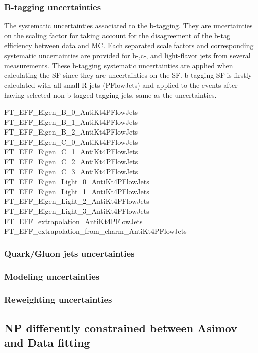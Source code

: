 \subsubsection{B-tagging uncertainties}
The systematic uncertainties associated to the b-tagging.
They are uncertainties on the scaling factor for taking account for the disagreement of the b-tag efficiency between data and MC. Each separated scale factors and corresponding systematic uncertainties are provided for b-,c-, and light-flavor jets from several measurements.
These b-tagging systematic uncertainties are applied when calculating the SF since they are uncertainties on the SF. b-tagging SF is firstly calculated with all small-R jets (PFlowJets) and applied to the events after having selected non b-tagged tagging jets, same as the uncertainties. 

FT_EFF_Eigen_B_0_AntiKt4PFlowJets FT_EFF_Eigen_B_1_AntiKt4PFlowJets FT_EFF_Eigen_B_2_AntiKt4PFlowJets FT_EFF_Eigen_C_0_AntiKt4PFlowJets FT_EFF_Eigen_C_1_AntiKt4PFlowJets FT_EFF_Eigen_C_2_AntiKt4PFlowJets FT_EFF_Eigen_C_3_AntiKt4PFlowJets FT_EFF_Eigen_Light_0_AntiKt4PFlowJets FT_EFF_Eigen_Light_1_AntiKt4PFlowJets FT_EFF_Eigen_Light_2_AntiKt4PFlowJets FT_EFF_Eigen_Light_3_AntiKt4PFlowJets FT_EFF_extrapolation_AntiKt4PFlowJets FT_EFF_extrapolation_from_charm_AntiKt4PFlowJets 

\subsubsection{Quark/Gluon jets uncertainties}
\subsubsection{Modeling uncertainties}
\subsubsection{Reweighting uncertainties}

\subsection{NP differently constrained between Asimov and Data fitting}